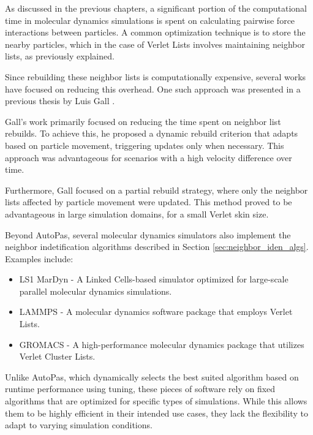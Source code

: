 As discussed in the previous chapters, a significant portion of the computational time in molecular dynamics simulations is spent on calculating pairwise force interactions between particles. A common optimization technique is to store the nearby particles, which in the case of Verlet Lists involves maintaining neighbor lists, as previously explained.

Since rebuilding these neighbor lists is computationally expensive, several works have focused on reducing this overhead. One such approach was presented in a previous thesis by Luis Gall \parencite{gall2023exploration}.

Gall's work primarily focused on reducing the time spent on neighbor list rebuilds. To achieve this, he proposed a dynamic rebuild criterion that adapts based on particle movement, triggering updates only when necessary. This approach was advantageous for scenarios with a high velocity difference over time.

Furthermore, Gall focused on a partial rebuild strategy, where only the neighbor lists affected by particle movement were updated. This method proved to be advantageous in large simulation domains, for a small Verlet skin size. 


Beyond AutoPas, several molecular dynamics simulators also implement the neighbor indetification algorithms described in Section \ref{sec:neighbor_iden_algs}. Examples include:

\begin{itemize}
    \item LS1 MarDyn - A Linked Cells-based simulator optimized for large-scale parallel molecular dynamics simulations. \parencite{niethammer2014ls1}
    \item LAMMPS - A molecular dynamics software package that employs Verlet Lists. \parencite{thompson2022lammps}
    \item GROMACS - A high-performance molecular dynamics package that utilizes Verlet Cluster Lists. \parencite{abraham2015gromacs}
\end{itemize}

Unlike AutoPas, which dynamically selects the best suited algorithm based on runtime performance using tuning, these pieces of software rely on fixed algorithms that are optimized for specific types of simulations. While this allows them to be highly efficient in their intended use cases, they lack the flexibility to adapt to varying simulation conditions.
